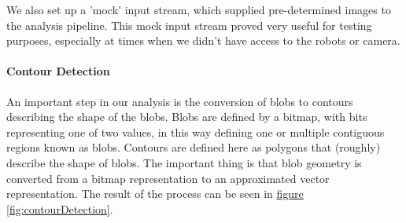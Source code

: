 \documentclass[10pt,twocolumn]{scrartcl}
\newcommand{\fref}[1]{\hyperref[#1]{figure \vref{#1}}}
\begin{document}
We also set up a 'mock' input stream, which supplied pre-determined images to the analysis pipeline. This mock input stream proved very useful for testing purposes, especially at times when we didn't have access to the robots or camera.

\paragraph{Contour Detection}
An important step in our analysis is the conversion of blobs to contours describing the shape of the blobs. Blobs are defined by a bitmap, with bits representing one of two values, in this way defining one or multiple contiguous regions known as blobs. Contours are defined here as polygons that (roughly) describe the shape of blobs. The important thing is that blob geometry is converted from a bitmap representation to an approximated vector representation. The result of the process can be seen in \fref{fig:contourDetection}.
\end{document}

